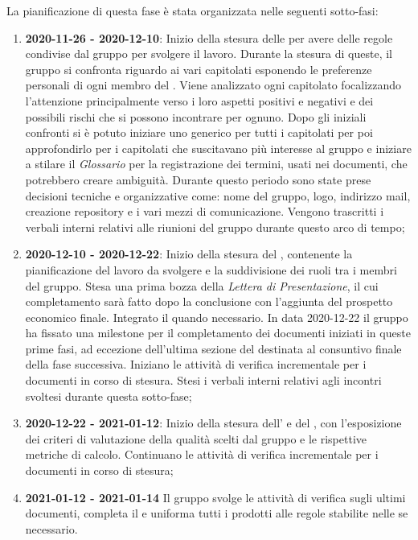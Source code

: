 La pianificazione di questa fase è stata organizzata nelle seguenti sotto-fasi:
\begin{enumerate}
\item \textbf{2020-11-26 - 2020-12-10}:
Inizio della stesura delle \textit{\NdP} per avere delle regole condivise dal gruppo per svolgere il lavoro. Durante la stesura di queste, il gruppo si confronta riguardo ai vari capitolati esponendo le preferenze personali di ogni membro del . Viene analizzato ogni capitolato focalizzando l'attenzione principalmente verso i loro aspetti positivi e negativi e dei possibili rischi che si possono incontrare per ognuno. Dopo gli iniziali confronti si è potuto iniziare uno \textit{\SdF} generico per tutti i capitolati per poi approfondirlo per i capitolati che suscitavano più interesse al gruppo e iniziare a stilare il \textit{Glossario} per la registrazione dei termini, usati nei documenti, che potrebbero creare ambiguità. Durante questo periodo sono state prese decisioni tecniche e organizzative come: nome del gruppo, logo, indirizzo mail, creazione repository e i vari mezzi di comunicazione. Vengono trascritti i verbali interni relativi alle riunioni del gruppo durante questo arco di tempo;
\item \textbf{2020-12-10 - 2020-12-22}:
Inizio della stesura del \textit{\PdP}, contenente la pianificazione del lavoro da svolgere e la suddivisione dei ruoli tra i membri del gruppo. Stesa una prima bozza della \textit{Lettera di Presentazione}, il cui completamento sarà fatto dopo la conclusione \textit{\PdP} con l'aggiunta del prospetto economico finale. Integrato il \textit{\Glossario} quando necessario. In data 2020-12-22 il gruppo ha fissato una milestone per il completamento dei documenti iniziati in queste prime fasi, ad eccezione dell'ultima sezione del \textit{\PdP} destinata al consuntivo finale della fase successiva. Iniziano le attività di verifica incrementale per i documenti in corso di stesura. Stesi i verbali interni relativi agli incontri svoltesi durante questa sotto-fase;
\item \textbf{2020-12-22 - 2021-01-12}:
    Inizio della stesura dell'\textit{\AdR} e del \textit{\PdQ}, con l'esposizione dei criteri di valutazione della qualità scelti dal gruppo e le rispettive metriche di calcolo. Continuano le attività di verifica incrementale per i documenti in corso di stesura;
\item \textbf{2021-01-12 - 2021-01-14}
    Il gruppo svolge le attività di verifica sugli ultimi documenti, completa il \textit{\Glossario} e uniforma tutti i prodotti alle regole stabilite nelle \textit{\NdP} se necessario.
\end{enumerate}

